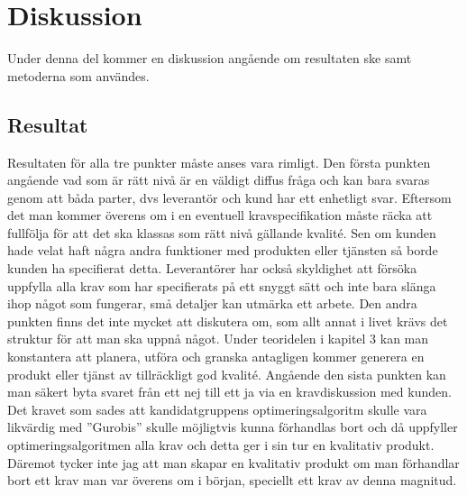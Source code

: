 \section{Diskussion}
Under denna del kommer en diskussion angående om resultaten ske samt metoderna som användes.
\subsection{Resultat}
Resultaten för alla tre punkter måste anses vara rimligt. Den första punkten angående vad som är rätt nivå är en väldigt diffus fråga och kan bara svaras genom att båda parter, dvs leverantör och kund har ett enhetligt svar. Eftersom det man kommer överens om i en eventuell kravspecifikation måste räcka att fullfölja för att det ska klassas som rätt nivå gällande kvalité. Sen om kunden hade velat haft några andra funktioner med produkten eller tjänsten så borde kunden ha specifierat detta. Leverantörer har också skyldighet att försöka uppfylla alla krav som har specifierats på ett snyggt sätt och inte bara slänga ihop något som fungerar, små detaljer kan utmärka ett arbete.
\newline
\newline
Den andra punkten finns det inte mycket att diskutera om, som allt annat i livet krävs det struktur för att man ska uppnå något. Under teoridelen i kapitel 3 kan man konstantera att planera, utföra och granska antagligen kommer generera en produkt eller tjänst av tillräckligt god kvalité.
\newline
\newline
Angående den sista punkten kan man säkert byta svaret från ett nej till ett ja via en kravdiskussion med kunden. Det kravet som sades att kandidatgruppens optimeringsalgoritm skulle vara likvärdig med ''Gurobis'' skulle möjligtvis kunna förhandlas bort och då uppfyller optimeringsalgoritmen alla krav och detta ger i sin tur en kvalitativ produkt. Däremot tycker inte jag att man skapar en kvalitativ produkt om man förhandlar bort ett krav man var överens om i början, speciellt ett krav av denna magnitud. 


